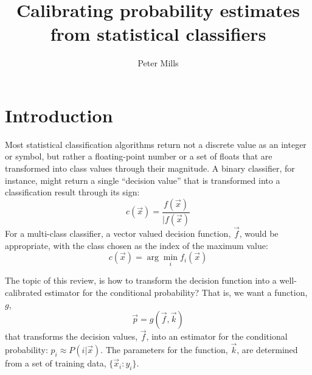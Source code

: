 \documentclass{article}
\newcommand{\classvalue}{c}
\newcommand{\binarydecision}{f}
\newcommand{\multidecision}{f}
\newcommand{\testpoint}{\vec x}
\newcommand{\transform}{g}
\newcommand{\param}{k}
\newcommand{\estimator}{{p}}
\newcommand{\condprob}{P}
\newcommand{\coord}{x}
\newcommand{\ord}{y}
\begin{document}
\title{Calibrating probability estimates from statistical classifiers}

\author{Peter Mills}

\maketitle

\section{Introduction}

Most statistical classification algorithms return not a discrete value as an 
integer or symbol, but rather a floating-point
number or a set of floats that are transformed into class values through
their magnitude.
A binary classifier, for instance, might return a single ``decision value'' that
is transformed into a classification result through its sign:
\begin{equation}
	\classvalue(\testpoint) = \frac{\binarydecision(\testpoint)}{|\binarydecision(\testpoint)}
\end{equation}
For a multi-class classifier, a vector valued decision function, 
$\vec \multidecision$, would be appropriate, with the class chosen as the
index of the maximum value:
\begin{equation}
	\classvalue(\testpoint) = \arg \min_i \multidecision_i (\vec x)
\end{equation}

The topic of this review, is how to transform the decision function into a
well-calibrated estimator for the conditional probability?
That is, we want a function, $\transform$,
\begin{equation}
  \vec \estimator = \transform(\vec \multidecision, \vec \param)
\end{equation}
that transforms the decision
values, $\vec \multidecision$, into an estimator for the conditional
probability: $\estimator_i \approx \condprob(i|\testpoint)$.
The parameters for the function, $\vec \param$, are determined from a set of 
training data, $\lbrace \vec \coord_i : \ord_i \rbrace$.
\end{document}
